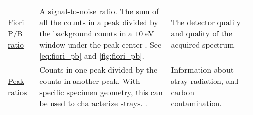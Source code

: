 \begin{table}[htp]
\begin{tabular}{p{2.5cm}p{8cm}p{3.5cm}}
        \hyperref[theory:eds_performance:fiori]{Fiori P/B ratio}                    & A signal-to-noise ratio. The sum of all the counts in a peak divided by the background counts in a $10$ eV window under the peak center  \cite{fiori_peak_background_1982,williams_carter_tem_2009}. See \cref{eq:fiori_pb} and \cref{fig:fiori_pb}.          & The detector quality and quality of the acquired spectrum.         \\
        \hyperref[theory:eds_performance:peakratio]{Peak ratios}                    & Counts in one peak divided by the counts in another peak. With specific specimen geometry, this can be used to characterize strays. \cite{egerton_nio_characterization_1994,ted_pella_nio_tem_2019}.                                                        & Information about stray radiation, and carbon contamination.       \\
        \hline
    \end{tabular}
\end{table}